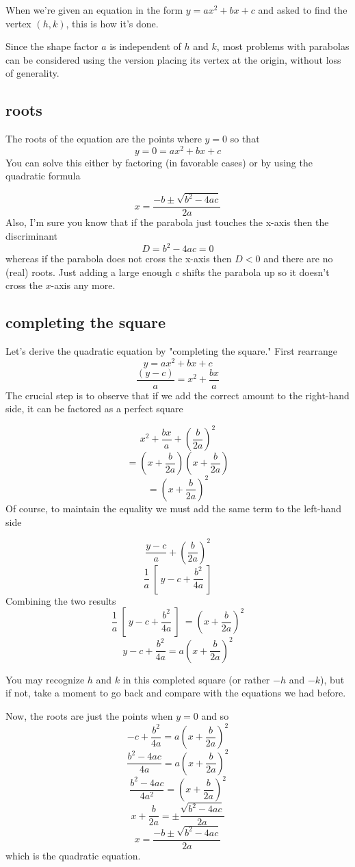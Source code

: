 \documentclass[11pt, oneside]{article}
\begin{document}
When we're given an equation in the form $y = ax^2 + bx + c$ and asked to find the vertex $(h,k)$, this is how it's done.

Since the shape factor $a$ is independent of $h$ and $k$, most problems with parabolas can be considered using the version placing its vertex at the origin, without loss of generality.
\subsection*{roots}
The roots of the equation are the points where $y = 0$ so that
\[ y = 0 = ax^2 + bx + c \]
You can solve this either by factoring (in favorable cases) or by using the quadratic formula

\[ x = \frac{-b \pm \sqrt{b^2 - 4ac}}{2a} \] 
Also, I'm sure you know that if the parabola just touches the x-axis then the discriminant 
\[ D = b^2 - 4ac = 0 \]
whereas if the parabola does not cross the x-axis then $D<0$ and there are no (real) roots.  Just adding a large enough $c$ shifts the parabola up so it doesn't cross the $x$-axis any more.

\hypertarget{completing_the_square}{}
\subsection*{completing the square}

Let's derive the quadratic equation by "completing the square."  First rearrange
\[ y = ax^2 + bx + c \]
\[ \frac{(y-c)}{a} = x^2 + \frac{bx}{a} \]
The crucial step is to observe that if we add the correct amount to the right-hand side, it can be factored as a perfect square

\[ x^2 + \frac{bx}{a} + (\frac{b}{2a})^2 \]
\[ = (x + \frac{b}{2a})(x + \frac{b}{2a}) \]
\[ = (x + \frac{b}{2a})^2 \]
Of course, to maintain the equality we must add the same term to the left-hand side

\[ \frac{y-c}{a} + (\frac{b}{2a})^2 \]
\[ \frac{1}{a} \ [ \ y - c + \frac{b^2}{4a} \ ] \]
Combining the two results
\[ \frac{1}{a} \ [ \ y - c + \frac{b^2}{4a} \ ] \ = (x + \frac{b}{2a})^2 \] 
\[ y-c + \frac{b^2}{4a} = a(x + \frac{b}{2a})^2 \]

You may recognize $h$ and $k$ in this completed square (or rather $-h$ and $-k$), but if not, take a moment to go back and compare with the equations we had before.  

Now, the roots are just the points when $y=0$ and so
\[  -c + \frac{b^2}{4a} = a(x + \frac{b}{2a})^2 \]
\[  \frac{b^2 -4ac}{4a} = a(x + \frac{b}{2a})^2 \]
\[  \frac{b^2-4ac}{4a^2} = (x + \frac{b}{2a})^2 \]
\[  x + \frac{b}{2a} = \pm \frac{\sqrt{b^2-4ac}}{2a}  \]
\[  x = \frac{-b \pm \sqrt{b^2-4ac}}{2a} \]
which is the quadratic equation.
\end{document}
